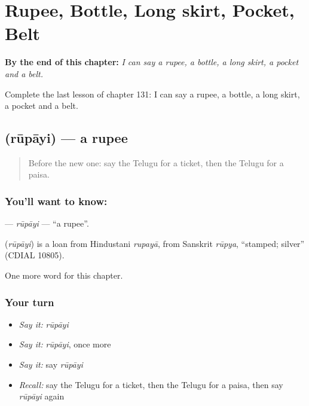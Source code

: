 
\chapter{Rupee, Bottle, Long skirt, Pocket, Belt}
\label{ch:te-rupee-bottle-long-skirt-pocket-belt}

\begin{chapteropening}
\textbf{By the end of this chapter:} \emph{I can say a rupee, a bottle, a long skirt, a pocket and a belt.}

Complete the last lesson of chapter 131: I can say a rupee, a bottle, a long skirt, a pocket and a belt.
\end{chapteropening}

\section[\texorpdfstring{\te{రూపాయి} (rūpāyi)}{రూపాయి (rūpāyi)}]{ (rūpāyi) — a rupee}

\label{lesson:TE-C131-rupayi}



\begin{quote}
Before the new one: say the Telugu for a ticket, then the Telugu for a paisa.
\end{quote}

\subsection*{You'll want to know: }
\textbf{} — \emph{rūpāyi} — \textquotedblleft{}a rupee\textquotedblright{}.

\begin{cousinweb}
\textbf{} (\emph{rūpāyi}) is a loan from Hindustani \emph{rupayā}, from Sanskrit \emph{rūpya}, \textquotedblleft{}stamped; silver\textquotedblright{} (CDIAL 10805).
\end{cousinweb}

\begin{grammarlens}[title={What you've built}]
One more word for this chapter.
\end{grammarlens}

\subsection*{Your turn}
\begin{itemize}
\raggedright
  \item \emph{Say it:} \emph{rūpāyi}
  \item \emph{Say it:} \emph{rūpāyi}, once more
  \item \emph{Say it:} say \emph{rūpāyi}
  \item \emph{Recall:} say the Telugu for a ticket, then the Telugu for a paisa, then say \emph{rūpāyi} again
\end{itemize}

